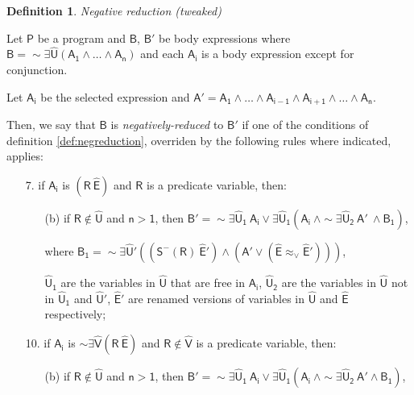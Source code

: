 \documentclass[inscr,ack,preface]{dithesis}
\theoremstyle{definition}
\newtheorem{definition}{Definition}[]
\newcommand{\msf}[1]{$\mathsf{#1}$}
\begin{document}
\begin{definition}{\emph{Negative reduction (tweaked)}}
\label{def:negreduction_new}

Let \msf{P} be a program and \msf{B}, \msf{B'} be body expressions where \msf{B = \sim \exists \widehat{U} \left( A_1 \land \dots \land A_n \right)} and each \msf{A_i} is a body expression except for conjunction.

Let \msf{A_i} be the selected expression and \msf{A' = A_1 \land \dots \land A_{i-1} \land A_{i+1} \land \dots \land A_n}.

Then, we say that \msf{B} is \emph{negatively-reduced} to \msf{B'} if one of the conditions of definition \ref{def:negreduction}, overriden by the following rules where indicated, applies:

\begin{enumerate}
  \item[7.] if \msf{A_i} is \msf{\left( R ~ \widehat{E} \right)} and \msf{R} is a predicate variable, then:
        \begin{enumerate}
          \item[(b)] if \msf{R \not \in \widehat{U}} and \msf{n > 1}, then
                \msf{B' = \sim \exists \widehat{U}_1 ~ A_i \lor \exists \widehat{U}_1 \left( A_i ~\land \sim \exists \widehat{U}_2 ~ A' ~\land B_{1} \right)},

                where \msf{B_{1} = \sim\exists \widehat{U}' \left( \left( S^{-}\left( R \right) ~\widehat{E}' \right) \land \left( A' \lor \left( \widehat{E} \approx_{\lor} \widehat{E}' \right) \right) \right)},

                \msf{\widehat{U}_1} are the variables in \msf{\widehat{U}} that are free in \msf{A_i}, \msf{\widehat{U}_2} are the variables in \msf{\widehat{U}} not in \msf{\widehat{U}_1} and \msf{\widehat{U}'}, \msf{\widehat{E}'} are renamed versions of variables in \msf{\widehat{U}} and \msf{\widehat{E}} respectively;
        \end{enumerate}
  \item[10.] if \msf{A_i} is \msf{\sim \exists \widehat{V} \left( R ~ \widehat{E} \right)} and \msf{R \not\in \widehat{V}} is a predicate variable,
        then:
        \begin{enumerate}
          \item[(b)] if \msf{R \not\in \widehat{U}} and \msf{n > 1},
                then \msf{B' = \sim \exists \widehat{U}_1 ~ A_i \lor \exists \widehat{U}_1 \left( A_i ~ \land \sim \exists \widehat{U}_2 ~ A' \land B_{1} \right)},


\end{enumerate}
\end{enumerate}
\end{definition}
\end{document}

